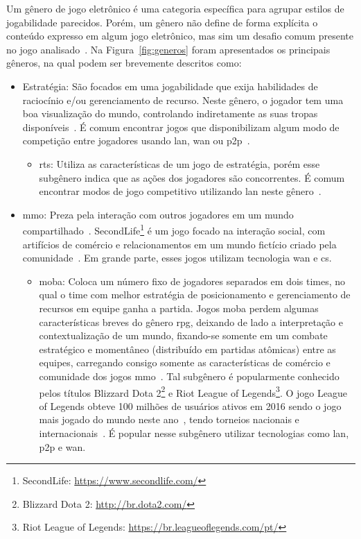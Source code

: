 Um gênero de jogo eletrônico é uma categoria específica para agrupar estilos de jogabilidade parecidos.
%
Porém, um gênero não define de forma explícita o conteúdo expresso em algum jogo eletrônico, mas sim um desafio comum presente no jogo analisado~\cite{adams_1208533, video_game_technologies}.
%
Na Figura~\ref{fig:generos} foram apresentados os principais gêneros, na qual podem ser brevemente descritos como:


\begin{itemize}
  \item Estratégia: São focados em uma jogabilidade que exija habilidades de raciocínio e/ou gerenciamento de recurso. Neste gênero, o jogador tem uma boa visualização do mundo, controlando indiretamente as suas tropas disponíveis~\cite{rollings2003andrew}. É comum encontrar jogos que disponibilizam algum modo de competição entre jogadores usando \ac{lan}, \ac{wan} ou \ac{p2p}~\cite{adams_1208533}.
    \begin{itemize}
      \item \ac{rts}: Utiliza as características de um jogo de estratégia, porém esse subgênero indica que as ações dos jogadores são concorrentes. É comum encontrar modos de jogo competitivo utilizando \ac{lan} neste gênero~\cite{adams_1208533}.
    \end{itemize}
  \item \ac{mmo}: Preza pela interação com outros jogadores em um mundo compartilhado~\cite{adams_1208533}. SecondLife\footnote{SecondLife: \url{https://www.secondlife.com/}} é um jogo focado na interação social, com artifícios de comércio e relacionamentos em um mundo fictício criado pela comunidade~\cite{tecmundo_secondlife}. Em grande parte, esses jogos utilizam tecnologia \ac{wan} e \ac{cs}.
    \begin{itemize}
      \item \ac{moba}: Coloca um número fixo de jogadores separados em dois times, no qual o time com melhor estratégia de posicionamento e gerenciamento de recursos em equipe ganha a partida. Jogos \ac{moba} perdem algumas características breves do gênero \ac{rpg}, deixando de lado a interpretação e contextualização de um mundo, fixando-se somente em um combate estratégico e momentâneo (distribuído em partidas atômicas) entre as equipes, carregando consigo somente as características de comércio e comunidade dos jogos \ac{mmo}~\cite{adams_1208533}. Tal subgênero é popularmente conhecido pelos títulos Blizzard Dota 2\footnote{Blizzard Dota 2: \url{http://br.dota2.com/}} e Riot League of Legends\footnote{Riot League of Legends: \url{https://br.leagueoflegends.com/pt/}}. O jogo League of Legends obteve 100 milhões de usuários ativos em 2016 sendo o jogo mais jogado do mundo neste ano~\cite{lol_statista}, tendo torneios nacionais e internacionais~\cite{lol_sportv}. É popular nesse subgênero utilizar tecnologias como \ac{lan}, \ac{p2p} e \ac{wan}.

\end{itemize}
\end{itemize}
